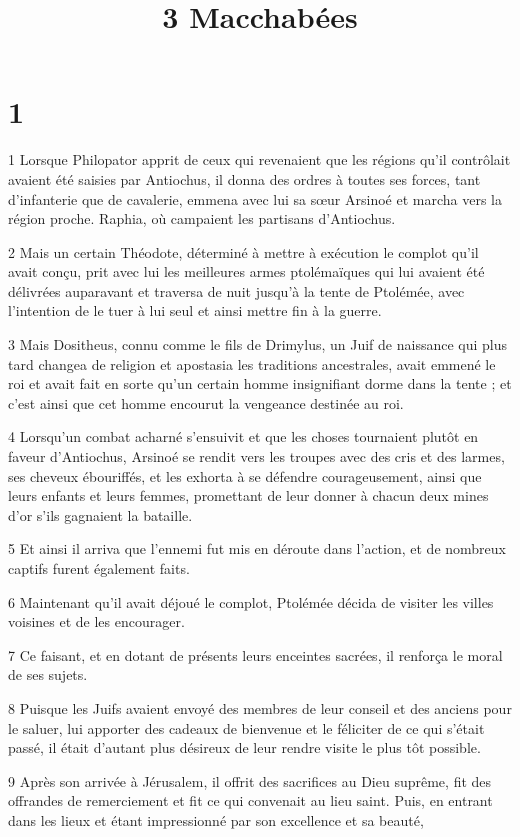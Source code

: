 

\title{3 Macchabées}


\chapter{1}

\par 1 Lorsque Philopator apprit de ceux qui revenaient que les régions qu'il contrôlait avaient été saisies par Antiochus, il donna des ordres à toutes ses forces, tant d'infanterie que de cavalerie, emmena avec lui sa sœur Arsinoé et marcha vers la région proche. Raphia, où campaient les partisans d'Antiochus.
\par 2 Mais un certain Théodote, déterminé à mettre à exécution le complot qu'il avait conçu, prit avec lui les meilleures armes ptolémaïques qui lui avaient été délivrées auparavant et traversa de nuit jusqu'à la tente de Ptolémée, avec l'intention de le tuer à lui seul et ainsi mettre fin à la guerre.
\par 3 Mais Dositheus, connu comme le fils de Drimylus, un Juif de naissance qui plus tard changea de religion et apostasia les traditions ancestrales, avait emmené le roi et avait fait en sorte qu'un certain homme insignifiant dorme dans la tente ; et c'est ainsi que cet homme encourut la vengeance destinée au roi.
\par 4 Lorsqu'un combat acharné s'ensuivit et que les choses tournaient plutôt en faveur d'Antiochus, Arsinoé se rendit vers les troupes avec des cris et des larmes, ses cheveux ébouriffés, et les exhorta à se défendre courageusement, ainsi que leurs enfants et leurs femmes, promettant de leur donner à chacun deux mines d'or s'ils gagnaient la bataille.
\par 5 Et ainsi il arriva que l'ennemi fut mis en déroute dans l'action, et de nombreux captifs furent également faits.
\par 6 Maintenant qu'il avait déjoué le complot, Ptolémée décida de visiter les villes voisines et de les encourager.
\par 7 Ce faisant, et en dotant de présents leurs enceintes sacrées, il renforça le moral de ses sujets.
\par 8 Puisque les Juifs avaient envoyé des membres de leur conseil et des anciens pour le saluer, lui apporter des cadeaux de bienvenue et le féliciter de ce qui s'était passé, il était d'autant plus désireux de leur rendre visite le plus tôt possible.
\par 9 Après son arrivée à Jérusalem, il offrit des sacrifices au Dieu suprême, fit des offrandes de remerciement et fit ce qui convenait au lieu saint. Puis, en entrant dans les lieux et étant impressionné par son excellence et sa beauté,
